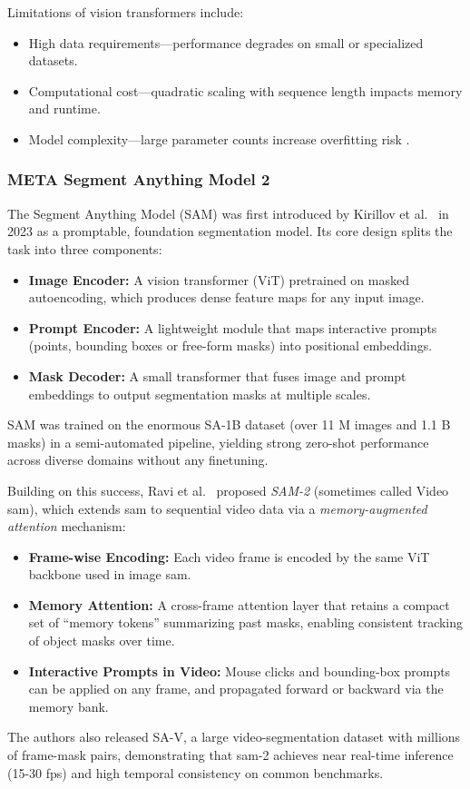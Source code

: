 Limitations of vision transformers include:
\begin{itemize}

    \item High data requirements—performance degrades on small or specialized datasets.  
    \item Computational cost—quadratic scaling with sequence length impacts memory and runtime.  
    \item Model complexity—large parameter counts increase overfitting risk \cite{lee_enhancing_mamba_s6_2024}.
\end{itemize}


\subsubsection{META Segment Anything Model 2}
\label{ssec:meta_sam2}

The Segment Anything Model (SAM) was first introduced by Kirillov et al.\ \cite{kirillov_segment_2023} in 2023 as a promptable, foundation segmentation model.  Its core design splits the task into three components:
\begin{itemize}
    \item \textbf{Image Encoder:} A vision transformer (ViT) pretrained on masked autoencoding, which produces dense feature maps for any input image.
    \item \textbf{Prompt Encoder:} A lightweight module that maps interactive prompts (points, bounding boxes or free-form masks) into positional embeddings.
    \item \textbf{Mask Decoder:} A small transformer that fuses image and prompt embeddings to output segmentation masks at multiple scales.
\end{itemize}
SAM was trained on the enormous SA-1B dataset (over 11 M images and 1.1 B masks) in a semi-automated pipeline, yielding strong zero-shot performance across diverse domains without any finetuning.

Building on this success, Ravi et al.\ \cite{ravi_sam_nodate} proposed \emph{SAM-2} (sometimes called Video \acrshort{sam}), which extends \acrshort{sam} to sequential video data via a \emph{memory-augmented attention} mechanism:
\begin{itemize}
    \item \textbf{Frame-wise Encoding:} Each video frame is encoded by the same ViT backbone used in image \acrshort{sam}.
    \item \textbf{Memory Attention:} A cross-frame attention layer that retains a compact set of “memory tokens” summarizing past masks, enabling consistent tracking of object masks over time.
    \item \textbf{Interactive Prompts in Video:} Mouse clicks and bounding-box prompts can be applied on any frame, and propagated forward or backward via the memory bank.
\end{itemize}
The authors also released SA-V, a large video-segmentation dataset with millions of frame-mask pairs, demonstrating that \acrshort{sam}-2 achieves near real-time inference (15-30 fps) and high temporal consistency on common benchmarks.

